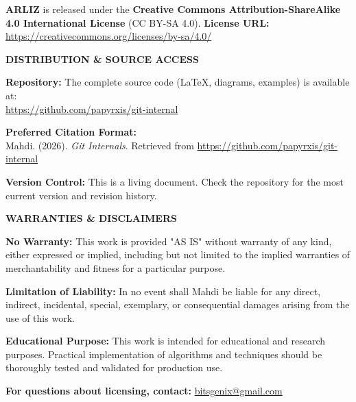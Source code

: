 \begin{flushleft}
	{\small
		\textbf{ARLIZ} is released under the \textbf{Creative Commons Attribution-ShareAlike 4.0 International License} (CC BY-SA 4.0).
		\textbf{License URL:} \url{https://creativecommons.org/licenses/by-sa/4.0/}
		
		\vspace{1em}
		
		\begin{center}
			\textbf{DISTRIBUTION \& SOURCE ACCESS}
		\end{center}
		
		\textbf{Repository:} The complete source code (LaTeX, diagrams, examples) is available at:\\
		\url{https://github.com/papyrxis/git-internal}
		
		\textbf{Preferred Citation Format:}\\
		Mahdi. (2026). \textit{Git Internals}. Retrieved from \url{https://github.com/papyrxis/git-internal}
		
		\textbf{Version Control:} This is a living document. Check the repository for the most current version and revision history.
		
		\vspace{1.5em}
		
		\begin{center}
			\textbf{WARRANTIES \& DISCLAIMERS}
		\end{center}
		
		\textbf{No Warranty:} This work is provided "AS IS" without warranty of any kind, either expressed or implied, including but not limited to the implied warranties of merchantability and fitness for a particular purpose.
		
		\textbf{Limitation of Liability:} In no event shall Mahdi be liable for any direct, indirect, incidental, special, exemplary, or consequential damages arising from the use of this work.
		
		\textbf{Educational Purpose:} This work is intended for educational and research purposes. Practical implementation of algorithms and techniques should be thoroughly tested and validated for production use.
	}
\end{flushleft}

\vfill

\begin{center}
	{\footnotesize

		\textbf{For questions about licensing, contact:} \url{bitsgenix@gmail.com}
	}
\end{center}

\clearpage